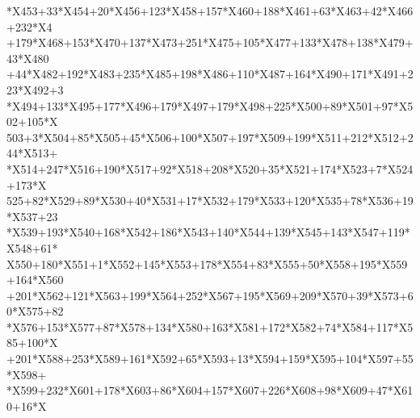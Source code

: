 \begin{tabbing}
*X453+33*X454+20*X456+123*X458+157*X460+188*X461+63*X463+42*X466+232*X4\\[0pt]
+179*X468+153*X470+137*X473+251*X475+105*X477+133*X478+138*X479+43*X480\\[0pt]
\>+44*X482+192*X483+235*X485+198*X486+110*X487+164*X490+171*X491+223*X492+3\\[0pt]
*X494+133*X495+177*X496+179*X497+179*X498+225*X500+89*X501+97*X502+105*X\\[0pt]
\>503+3*X504+85*X505+45*X506+100*X507+197*X509+199*X511+212*X512+244*X513+\\[0pt]
*X514+247*X516+190*X517+92*X518+208*X520+35*X521+174*X523+7*X524+173*X\\[0pt]
\>525+82*X529+89*X530+40*X531+17*X532+179*X533+120*X535+78*X536+19*X537+23\\[0pt]
*X539+193*X540+168*X542+186*X543+140*X544+139*X545+143*X547+119*X548+61*\\[0pt]
\>X550+180*X551+1*X552+145*X553+178*X554+83*X555+50*X558+195*X559+164*X560\\[0pt]
\>+201*X562+121*X563+199*X564+252*X567+195*X569+209*X570+39*X573+60*X575+82\\[0pt]
\>*X576+153*X577+87*X578+134*X580+163*X581+172*X582+74*X584+117*X585+100*X\\[0pt]
+201*X588+253*X589+161*X592+65*X593+13*X594+159*X595+104*X597+55*X598+\\[0pt]
*X599+232*X601+178*X603+86*X604+157*X607+226*X608+98*X609+47*X610+16*X\\[0pt]

\end{tabbing}
